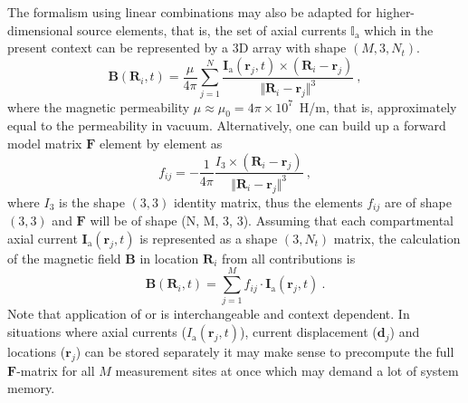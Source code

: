 The formalism using linear combinations may also be adapted for higher-dimensional source elements, that is,
the set of axial currents $\mathbb{I}_\mathrm{a}$ which in the present context can be represented by a 3D array with shape $(M, 3, N_t)$.
%
\begin{equation}
\mathbf{B}(\mathbf{R}_i, t) = \frac{\mu}{4\pi} \sum_{j=1}^N \frac{\mathbf{I}_\mathrm{a}(\mathbf{r}_j, t) \times (\mathbf{R}_i - \mathbf{r}_j) }{\Vert \mathbf{R}_i - \mathbf{r}_j \Vert^3} ~,
\label{eq:LFPy_biotsavart1}
\end{equation}
%
where the magnetic permeability $\mu \approx \mu_0=4\pi\times 10^7$~\si{\henry/\metre}, that is, 
approximately equal to the permeability in vacuum.
Alternatively,
one can build up a forward model matrix $\mathbf{F}$ element by element as
%
\begin{equation}
f_{ij} = - \frac{1}{4\pi} \frac{I_3 \times (\mathbf{R}_i - \mathbf{r}_j) }{\Vert \mathbf{R}_i - \mathbf{r}_j \Vert^3} ~,
\label{eq:LFPy_biotsavart2}
\end{equation}
%
where $I_3$ is the shape $(3, 3)$ identity matrix,
thus the elements $f_{ij}$ are of shape $(3, 3)$ and $\mathbf{F}$ will be of shape (N, M, 3, 3).
Assuming that each compartmental axial current $\mathbf{I}_\mathrm{a}(\mathbf{r}_j, t)$ is represented as a shape $(3, N_t)$ matrix,
the calculation of the magnetic field $\mathbf{B}$ in location $\mathbf{R}_i$ from all contributions is
%
\begin{equation}
\mathbf{B}(\mathbf{R}_i, t) = \sum_{j=1}^M f_{ij} \cdot \mathbf{I}_\mathrm{a}(\mathbf{r}_j, t) ~.
\label{eq:LFPy_biotsavart3}
\end{equation}
%
Note that application of  or  is interchangeable and context dependent.
In situations where axial currents ($I_\mathrm{a}(\mathbf{r}_j, t)$),
current displacement ($\mathbf{d}_j$) and locations ($\mathbf{r}_j$) can be stored separately it may make sense to precompute the full $\mathbf{F}$-matrix for all $M$ measurement sites at once which may demand a lot of system memory. 
